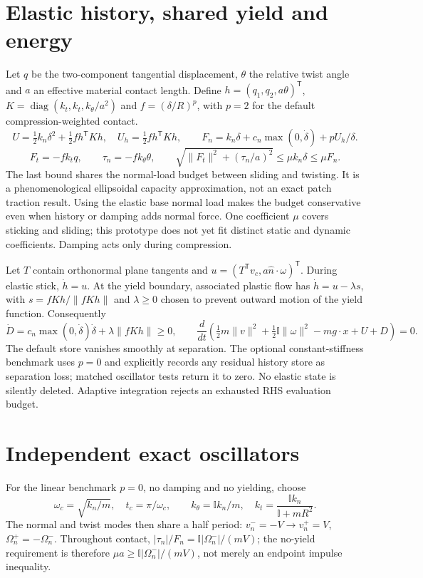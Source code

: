 \documentclass[10pt]{article}
\begin{document}
\section*{Elastic history, shared yield and energy}
Let $q$ be the two-component tangential displacement, $\theta$ the relative twist angle and $a$ an effective material contact length. Define $h=(q_1,q_2,a\theta)^\mathsf{T}$, $K=\operatorname{diag}(k_t,k_t,k_\theta/a^2)$ and $f=(\delta/R)^p$, with $p=2$ for the default compression-weighted contact.
\[
U=\tfrac12k_n\delta^2+\tfrac12 f h^\mathsf TK h,\quad U_h=\tfrac12 f h^\mathsf TK h,\qquad
F_n=k_n\delta+c_n\max(0,\dot\delta)+pU_h/\delta.
\]
\[
F_t=-f k_t q,\qquad \tau_n=-f k_\theta\theta,\qquad
\sqrt{\lVert F_t\rVert^2+(\tau_n/a)^2}\leq\mu k_n\delta\leq\mu F_n.
\]
The last bound shares the normal-load budget between sliding and twisting. It is a phenomenological ellipsoidal capacity approximation, not an exact patch traction result. Using the elastic base normal load makes the budget conservative even when history or damping adds normal force. One coefficient $\mu$ covers sticking and sliding; this prototype does not yet fit distinct static and dynamic coefficients. Damping acts only during compression.

Let $T$ contain orthonormal plane tangents and $u=(T^\mathsf Tv_c,a\hat n\cdot\omega)^\mathsf T$. During elastic stick, $\dot h=u$. At the yield boundary, associated plastic flow has $\dot h=u-\lambda s$, with $s=fKh/\lVert fKh\rVert$ and $\lambda\geq0$ chosen to prevent outward motion of the yield function. Consequently
\[
\dot D=c_n\max(0,\dot\delta)\dot\delta+\lambda\lVert fKh\rVert\geq0,\qquad
\frac{d}{dt}\left(\tfrac12m\lVert v\rVert^2+\tfrac12\mathbb I\lVert\omega\rVert^2-mg\cdot x+U+D\right)=0.
\]
The default store vanishes smoothly at separation. The optional constant-stiffness benchmark uses $p=0$ and explicitly records any residual history store as separation loss; matched oscillator tests return it to zero. No elastic state is silently deleted. Adaptive integration rejects an exhausted RHS evaluation budget.
\section*{Independent exact oscillators}
For the linear benchmark $p=0$, no damping and no yielding, choose
\[
\omega_c=\sqrt{k_n/m},\quad t_c=\pi/\omega_c,\qquad
k_\theta=\mathbb I k_n/m,\quad k_t=\frac{\mathbb I k_n}{\mathbb I+mR^2}.
\]
The normal and twist modes then share a half period: $v_n^-=-V\to v_n^+=V$, $\Omega_n^+=-\Omega_n^-$. Throughout contact, $|\tau_n|/F_n=\mathbb I|\Omega_n^-|/(mV)$; the no-yield requirement is therefore $\mu a\geq\mathbb I|\Omega_n^-|/(mV)$, not merely an endpoint impulse inequality.
\end{document}
